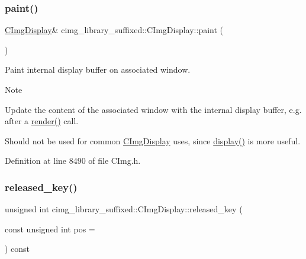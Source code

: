 \subsubsection{\texorpdfstring{paint()}{paint()}}
{\footnotesize\ttfamily \hyperlink{structcimg__library__suffixed_1_1CImgDisplay}{C\+Img\+Display}\& cimg\+\_\+library\+\_\+suffixed\+::\+C\+Img\+Display\+::paint (\begin{DoxyParamCaption}{ }\end{DoxyParamCaption})\hspace{0.3cm}{\ttfamily [inline]}}



Paint internal display buffer on associated window. 

\begin{DoxyNote}{Note}

\begin{DoxyItemize}
\item Update the content of the associated window with the internal display buffer, e.\+g. after a \hyperlink{structcimg__library__suffixed_1_1CImgDisplay_a267d574c78d29cd9f475a30b206882c6}{render()} call.
\item Should not be used for common \hyperlink{structcimg__library__suffixed_1_1CImgDisplay}{C\+Img\+Display} uses, since \hyperlink{structcimg__library__suffixed_1_1CImgDisplay_ad08f2f8b85cdd55d5e3ea71bdebf2b67}{display()} is more useful. 
\end{DoxyItemize}
\end{DoxyNote}


Definition at line 8490 of file C\+Img.\+h.

\mbox{\label{structcimg__library__suffixed_1_1CImgDisplay_a537d30bd26b82bc6ed4afc8777adb097}} 
\subsubsection{\texorpdfstring{released\+\_\+key()}{released\_key()}}
{\footnotesize\ttfamily unsigned int cimg\+\_\+library\+\_\+suffixed\+::\+C\+Img\+Display\+::released\+\_\+key (\begin{DoxyParamCaption}\item[{const unsigned int}]{pos = {} }\end{DoxyParamCaption}) const\hspace{0.3cm}{\ttfamily [inline]}}



